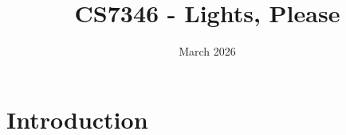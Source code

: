 \documentclass{article}
\title{CS7346 - Lights, Please}
\author{}
\date{March 2026}
\begin{document}
\maketitle

\section{Introduction}
\end{document}

